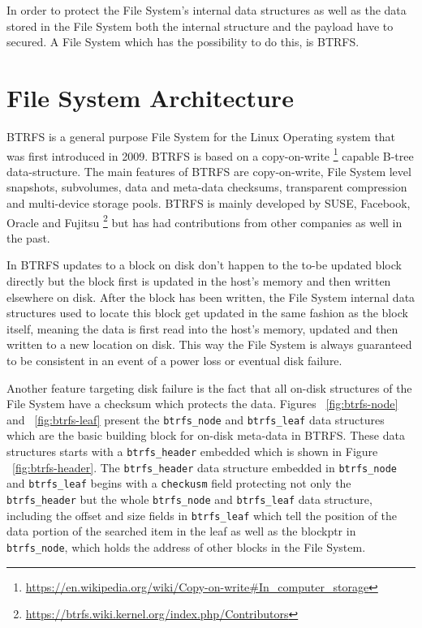 \documentclass[10pt]{article}
\begin{document}
In order to protect the File System's internal data structures as well as the
data stored in the File System both the internal structure and the payload
have to secured. A File System which has the possibility to do this, is BTRFS.

\section{File System Architecture}
BTRFS\cite{BTRFS} is a general purpose File System for the Linux Operating
system that was first introduced in 2009. BTRFS is based on a copy-on-write
\footnote{\href{https://en.wikipedia.org/wiki/Copy-on-write\#In\_computer\_storage}
{https://en.wikipedia.org/wiki/Copy-on-write\#In\_computer\_storage}} capable
B-tree\cite{rodeh} data-structure. The main features of BTRFS are
copy-on-write, File System level snapshots, subvolumes, data and meta-data
checksums, transparent compression and multi-device storage pools. BTRFS is
mainly developed by SUSE, Facebook, Oracle and Fujitsu
\footnote{\href{https://btrfs.wiki.kernel.org/index.php/Contributors}
{https://btrfs.wiki.kernel.org/index.php/Contributors}} but has had
contributions from other companies as well in the past.

In BTRFS updates to a block on disk don't happen to the to-be updated block
directly but the block first is updated in the host's memory and then written
elsewhere on disk. After the block has been written, the File System internal
data structures used to locate this block get updated in the same fashion as
the block itself, meaning the data is first read into the host's memory,
updated and then written to a new location on disk. This way the File System
is always guaranteed to be consistent in an event of a power loss or eventual
disk failure. 

Another feature targeting disk failure is the fact that all on-disk structures
of the File System have a checksum which protects the data. Figures
~\ref{fig:btrfs-node} and ~\ref{fig:btrfs-leaf} present the
\texttt{btrfs\_node} and \texttt{btrfs\_leaf} data structures which are the
basic building block for on-disk meta-data in BTRFS. These data structures
starts with a \texttt{btrfs\_header} embedded which is shown in Figure
~\ref{fig:btrfs-header}. The \texttt{btrfs\_header} data structure embedded in
\texttt{btrfs\_node} and \texttt{btrfs\_leaf} begins with a \texttt{checkusm}
field protecting not only the \texttt{btrfs\_header} but the whole
\texttt{btrfs\_node} and \texttt{btrfs\_leaf} data structure, including the
offset and size fields in \texttt{btrfs\_leaf} which tell the position of the
data portion of the searched item in the leaf as well as the blockptr in
\texttt{btrfs\_node}, which holds the address of other blocks in the File
System.
\end{document}
